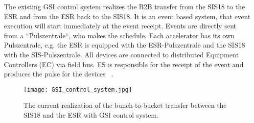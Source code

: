 The existing GSI control system realizes the B2B transfer from the SIS18 to the ESR and from the ESR back to the SIS18. It is an event based system, that event execution will start immediately at the event receipt. Events are directly sent from a ``Pulszentrale``, who makes the schedule. Each accelerator has its own Pulszentrale, e.g. the ESR is equipped with the ESR-Pulszentrale and the SIS18 with the SIS-Pulszentrale. All devices are connected to distributed Equipment Controllers (EC) via field bus. ES is responsible for the receipt of the event and produces the pulse for the devices ~\cite{kainberger_pzs_2003, krause_re-engineering_2001}. 
\begin{figure}[H]
   \centering   
   \texttt{[image: GSI\_control\_system.jpg]}
   \caption{The current realization of the bunch-to-bucket transfer between the SIS18 and the ESR with GSI control system.}
   \label{GSI_control_system}
\end{figure}
